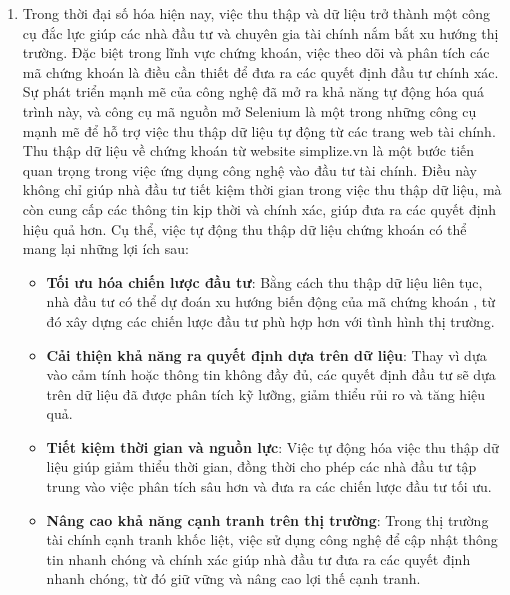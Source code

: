 \begin{enumerate}
	\item[] 
         \hspace*{0.7cm} Trong thời đại số hóa hiện nay, việc thu thập và dữ liệu trở thành một công cụ đắc lực giúp các nhà đầu tư và chuyên gia tài chính nắm bắt xu hướng thị trường. Đặc biệt trong lĩnh vực chứng khoán, việc theo dõi và phân tích các mã chứng khoán là điều cần thiết để đưa ra các quyết định đầu tư chính xác. Sự phát triển mạnh mẽ của công nghệ đã mở ra khả năng tự động hóa quá trình này, và công cụ mã nguồn mở Selenium là một trong những công cụ mạnh mẽ để hỗ trợ việc thu thập dữ liệu tự động từ các trang web tài chính.\\

         \hspace*{0.7cm} Thu thập dữ liệu về chứng khoán từ website simplize.vn là một bước tiến quan trọng trong việc ứng dụng công nghệ vào đầu tư tài chính. Điều này không chỉ giúp nhà đầu tư tiết kiệm thời gian trong việc thu thập dữ liệu, mà còn cung cấp các thông tin kịp thời và chính xác, giúp đưa ra các quyết định hiệu quả hơn. Cụ thể, việc tự động thu thập dữ liệu chứng khoán có thể mang lại những lợi ích sau:\\

         \begin{itemize}[left=0.5cm] 
             \item[$\bullet$] \textbf{Tối ưu hóa chiến lược đầu tư}: Bằng cách thu thập dữ liệu liên tục, nhà đầu tư có thể dự đoán xu hướng biến động của mã chứng khoán , từ đó xây dựng các chiến lược đầu tư phù hợp hơn với tình hình thị trường.\\
             
             \item[$\bullet$]\textbf{Cải thiện khả năng ra quyết định dựa trên dữ liệu}: Thay vì dựa vào cảm tính hoặc thông tin không đầy đủ, các quyết định đầu tư sẽ dựa trên dữ liệu đã được phân tích kỹ lưỡng, giảm thiểu rủi ro và tăng hiệu quả.\\

             \item[$\bullet$]\textbf{Tiết kiệm thời gian và nguồn lực}: Việc tự động hóa việc thu thập dữ liệu giúp giảm thiểu thời gian, đồng thời cho phép các nhà đầu tư tập trung vào việc phân tích sâu hơn và đưa ra các chiến lược đầu tư tối ưu.\\
             
             \item[$\bullet$]\textbf{Nâng cao khả năng cạnh tranh trên thị trường}: Trong thị trường tài chính cạnh tranh khốc liệt, việc sử dụng công nghệ để cập nhật thông tin nhanh chóng và chính xác giúp nhà đầu tư đưa ra các quyết định nhanh chóng, từ đó giữ vững và nâng cao lợi thế cạnh tranh.
            

\end{itemize}
\end{enumerate}
